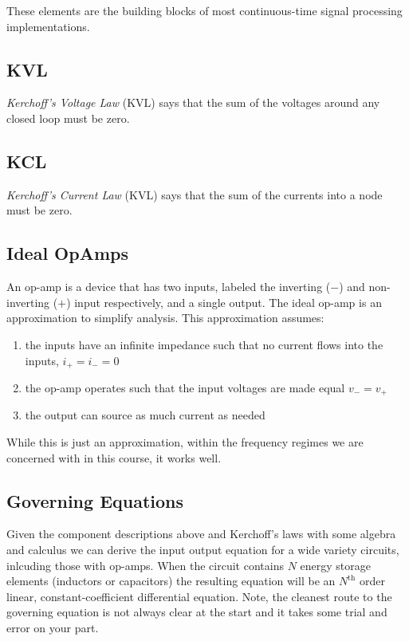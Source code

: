 These elements are the building blocks of most continuous-time signal processing implementations.

\subsection*{KVL}

\textit{Kerchoff's Voltage Law} (KVL) says that the sum of the voltages around any closed loop must be zero.

\subsection*{KCL}

\textit{Kerchoff's Current Law} (KVL) says that the sum of the currents into a node must be zero.

\subsection*{Ideal OpAmps}

An op-amp is a device that has two inputs, labeled the inverting ($-$) and non-inverting ($+$) input respectively, and a single output. The ideal op-amp is an approximation to simplify analysis. This approximation assumes:

\begin{enumerate}
\item the inputs have an infinite impedance such that no current flows into the inputs, $i_+ = i_- = 0$
\item the op-amp operates such that the input voltages are made equal $v_- = v_+$
\item the output can source as much current as needed
\end{enumerate}
 
While this is just an approximation, within the frequency regimes we are concerned with in this course, it works well. 

\subsection*{Governing Equations}

Given the component descriptions above and Kerchoff's laws with some algebra and calculus we can derive the input output equation for a wide variety circuits, inlcuding those with op-amps. When the circuit contains $N$ energy storage elements (inductors or capacitors) the resulting equation will be an $N^\text{th}$ order linear, constant-coefficient differential equation. Note, the cleanest route to the governing equation is not always clear at the start and it takes some trial and error on your part.

